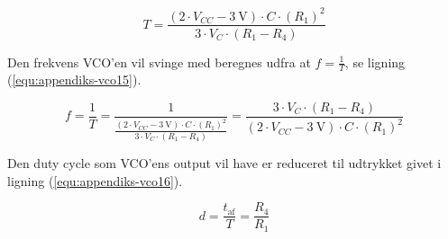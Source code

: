 \begin{equation}
\label{equ:appendiks-vco14b}
T = \frac{(2 \cdot V_{CC} - 3~\mathrm{V}) \cdot C \cdot (R_1)^2}{3 \cdot V_C \cdot (R_1 - R_4)}
\end{equation}

Den frekvens VCO'en vil svinge med beregnes udfra at $f = \frac{1}{T}$, se ligning (\ref{equ:appendiks-vco15}).

\begin{equation}
\label{equ:appendiks-vco15}
f = \frac{1}{T} = \frac{1}{\frac{(2 \cdot V_{CC} - 3~\mathrm{V}) \cdot C \cdot (R_1)^2}{3 \cdot V_C \cdot (R_1 - R_4)}} = \frac{3 \cdot V_C \cdot (R_1 - R_4)}{(2 \cdot V_{CC} - 3~\mathrm{V}) \cdot C \cdot (R_1)^2}
\end{equation}

Den duty cycle som VCO'ens output vil have er reduceret til udtrykket givet i ligning (\ref{equ:appendiks-vco16}).

\begin{equation}
\label{equ:appendiks-vco16}
d = \frac{t_{\mathrm{af}}}{T} = \frac{R_4}{R_1}
\end{equation}